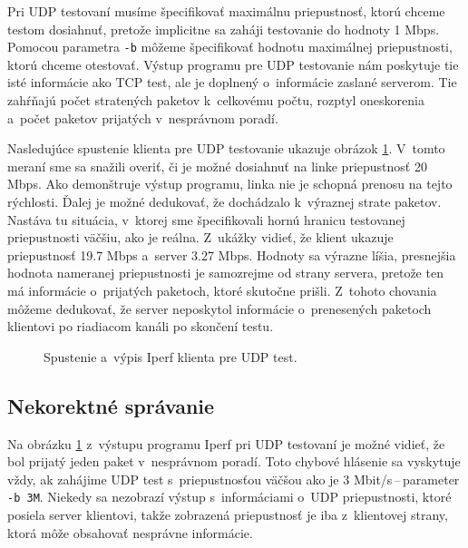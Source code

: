        Pri UDP testovaní musíme špecifikovať maximálnu priepustnosť, ktorú
       chceme testom dosiahnuť, pretože implicitne sa zaháji testovanie do 
       hodnoty 1 Mbps. Pomocou parametra \texttt{-b} môžeme špecifikovať
       hodnotu maximálnej priepustnosti, ktorú chceme otestovať.
       Výstup programu pre UDP testovanie nám poskytuje tie isté informácie ako 
       TCP test, ale je doplnený o~informácie zaslané serverom. 
       Tie zahŕňajú počet stratených
       paketov k~celkovému počtu, rozptyl oneskorenia a~počet paketov prijatých
       v~nesprávnom poradí.
       
       Nasledujúce spustenie klienta pre UDP testovanie ukazuje obrázok 
       \ref{iperf_c_u_i_b_80}. V~tomto meraní sme sa snažili overiť, či je
       možné dosiahnuť na linke priepustnosť 20 Mbps. Ako demonštruje výstup
       programu, linka nie je schopná prenosu na tejto rýchlosti. Ďalej je možné
       dedukovať, že dochádzalo k~výraznej strate paketov. Nastáva tu 
       situácia, v~ktorej sme špecifikovali hornú hranicu testovanej
       priepustnosti väčšiu, ako je reálna. 
       Z~ukážky vidieť, že klient ukazuje priepustnosť 19.7
       Mbps a~server 3.27 Mbps. Hodnoty sa výrazne líšia, presnejšia
       hodnota nameranej priepustnosti je samozrejme od strany servera, pretože
       ten má informácie o~prijatých paketoch, ktoré skutočne prišli.
       Z~tohoto chovania môžeme dedukovať, že server neposkytol informácie
       o~prenesených paketoch klientovi po riadiacom kanáli po skončení testu.

       \begin{figure}[H]
           \begin{center}
               \caption{Spustenie a~výpis Iperf klienta pre UDP test.}
               \label{iperf_c_u_i_b_80}
           \end{center}
       \end{figure}

        \subsection{Nekorektné správanie} \label{iperf_chyby}
        Na obrázku \ref{iperf_c_u_i_b_80} z~výstupu programu Iperf pri UDP
        testovaní je možné vidieť, že bol prijatý jeden paket v~nesprávnom
        poradí. Toto chybové hlásenie sa vyskytuje vždy, ak zahájime UDP test
        s~priepustnosťou väčšou ako je 3 Mbit/s\,--\,parameter \texttt{-b 3M}.
        Niekedy sa nezobrazí výstup s~informáciami o~UDP priepustnosti, ktoré 
        posiela server klientovi, takže zobrazená priepustnosť je iba
        z~klientovej strany, ktorá môže obsahovať nesprávne informácie.

